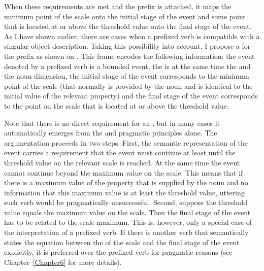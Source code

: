 When these requirements are met and the prefix is attached, it maps the minimum point of the scale onto the initial stage of the event and some point that is located at or above the threshold value onto the final stage of the event.  As I have shown earlier, there are cases when a prefixed verb is compatible with a singular object description. Taking this possibility into account, I propose a  for the prefix as shown on . This frame encodes the following information: the event denoted by a prefixed verb is a bounded event, the  is at the same time the  and the noun dimension, the initial stage of the event corresponds to the minimum point of the  scale (that normally is provided by the noun and is identical to the initial value of the relevant property) and the final stage of the event corresponds to the point on the scale that is located at or above the threshold value. 

Note that there is no direct requirement for an , but in many cases it automatically emerges from the  and pragmatic principles alone. The argumentation proceeds in two steps. First, the semantic representation of the event carries a requirement that the event must continue at least until the threshold value on the relevant scale is reached. At the same time the event cannot continue beyond the maximum value on the scale. This means that if there is a maximum value of the property that is supplied by the noun and no information that this maximum value is at least the threshold value, uttering such verb would be pragmatically unsuccessful. Second, suppose the threshold value equals the maximum value on the scale. Then the final stage of the event has to be related to the scale maximum. This is, however, only a special case of the interpretation of a prefixed verb. If there is another verb that semantically states the equation between the  of the scale and the final stage of the event explicitly, it is preferred over the prefixed verb for pragmatic reasons (see Chapter~\ref{Chapter6} for more details). 

